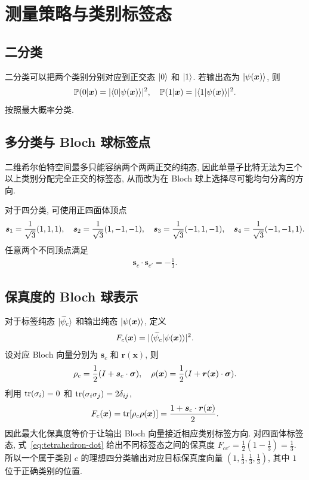 \documentclass[a4paper]{ctexart}
\begin{document}
\section{测量策略与类别标签态}

\subsection{二分类}

二分类可以把两个类别分别对应到正交态 $\ket{0}$ 和 $\ket{1}$. 若输出态为 $\ket{\psi(\bm{x})}$, 则
\begin{align}
    \mathbb{P}(0|\bm{x})=\lvert\braket{0 | \psi(\bm{x})}\rvert^2, \quad \mathbb{P}(1|\bm{x})=\lvert\braket{1 | \psi(\bm{x})}\rvert^2.
\end{align}
按照最大概率分类.

\subsection{多分类与 Bloch 球标签点}

二维希尔伯特空间最多只能容纳两个两两正交的纯态, 因此单量子比特无法为三个以上类别分配完全正交的标签态, 从而改为在 Bloch 球上选择尽可能均匀分离的方向.

对于四分类, 可使用正四面体顶点
\begin{align}
    \bm{s}_1=\frac{1}{\sqrt{3}}(1, 1, 1), \quad \bm{s}_2=\frac{1}{\sqrt{3}}(1, -1, -1), \quad \bm{s}_3=\frac{1}{\sqrt{3}}(-1, 1, -1), \quad \bm{s}_4=\frac{1}{\sqrt{3}}(-1, -1, 1).
\end{align}
任意两个不同顶点满足
\begin{align}
    \bm{s}_c\cdot\bm{s}_{c'}=-\frac{1}{3}.
    \label{eq:tetrahedron-dot}
\end{align}

\subsection{保真度的 Bloch 球表示}

对于标签纯态 $\ket{\widetilde{\psi}_c}$ 和输出纯态 $\ket{\psi(\bm{x})}$, 定义
\begin{align}
    F_c(\bm{x})=\lvert\braket{\widetilde{\psi}_c|\psi(\bm{x})}\rvert^2.
\end{align}
设对应 Bloch 向量分别为 $\bm{s}_c$ 和 $\bm{r}(\bm{x})$, 则
\begin{align}
    \rho_c=\frac{1}{2}(I+\bm{s}_c\cdot\bm{\sigma}), \quad \rho(\bm{x})=\frac{1}{2}(I+\bm{r}(\bm{x})\cdot\bm{\sigma}).
\end{align}
利用 $\operatorname{tr}(\sigma_i)=0$ 和 $\operatorname{tr}(\sigma_i\sigma_j)=2\delta_{ij}$,
\begin{align}
    F_c(\bm{x})=\operatorname{tr}[\rho_c\rho(\bm{x})]=\frac{1+\bm{s}_c\cdot\bm{r}(\bm{x})}{2}.
\end{align}
因此最大化保真度等价于让输出 Bloch 向量接近相应类别标签方向. 对四面体标签态, 式~\eqref{eq:tetrahedron-dot} 给出不同标签态之间的保真度 $F_{cc'}=\frac{1}{2}(1-\frac{1}{3})=\frac{1}{3}$. 所以一个属于类别 $c$ 的理想四分类输出对应目标保真度向量 $(1, \frac{1}{3}, \frac{1}{3}, \frac{1}{3})$, 其中 $1$ 位于正确类别的位置.
\end{document}
